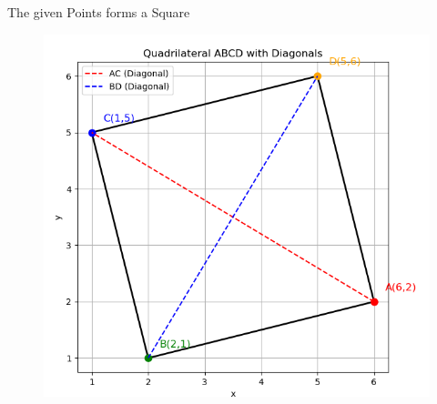 \documentclass[journal,12pt,onecolumn]{IEEEtran}
\begin{document}
        \begin{center}
	       The given Points  forms a Square
           \end{center}
	   \begin{figure}[h!]
               \centering
               \includegraphics[width=0.7\linewidth]{figs/fig1.png}
               \caption{}
               \label{plot}
           \end{figure}
\end{document}
